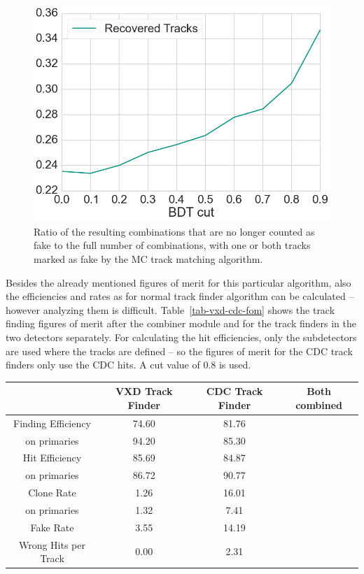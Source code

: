 \begin{figure}
  \centering
  \includegraphics[width=0.7\linewidth]{figures/workflow/vxd_cdc_merger_recovered.png}
  \caption{Ratio of the resulting combinations that are no longer counted as fake to the full number of combinations, with one or both tracks marked as fake by the MC track matching algorithm.}
  \label{fig-vxd-cdc-recovered}
\end{figure}

Besides the already mentioned figures of merit for this particular algorithm, also the efficiencies and rates as for normal track finder algorithm can be calculated -- however analyzing them is difficult. Table~\ref{tab-vxd-cdc-fom} shows the track finding figures of merit after the combiner module and for the track finders in the two detectors separately. For calculating the hit efficiencies, only the subdetectors are used where the tracks are defined -- so the figures of merit for the CDC track finders only use the CDC hits. A cut value of 0.8 is used.


\begin{table}
  \centering
  \begin{tabular}{cccc} \toprule
    & VXD Track Finder & CDC Track Finder & Both combined \\ \midrule
    Finding Efficiency   & 74.60 & 81.76 &  \\
    \quad on primaries   & 94.20 & 85.30 &  \\ 
    Hit Efficiency       & 85.69 & 84.87 &  \\
    \quad on primaries   & 86.72 & 90.77 &  \\ 
    Clone Rate           & 1.26 & 16.01 &  \\
    \quad on primaries   & 1.32 & 7.41 &  \\ 
    Fake Rate            & 3.55 & 14.19 &  \\ 
    Wrong Hits per Track & 0.00 & 2.31 &  \\ \bottomrule
  \end{tabular}
\end{table}


